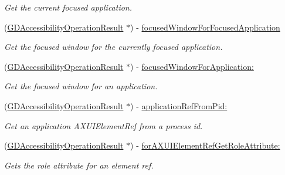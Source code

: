 \begin{DoxyCompactItemize}
\begin{DoxyCompactList}\small\item\em Get the current focused application. \item\end{DoxyCompactList}\item 
\hypertarget{interface_g_d_accessibility_manager_a2316da3b49b4bd75e92970377e2025c8}{
(\hyperlink{interface_g_d_accessibility_operation_result}{GDAccessibilityOperationResult} $\ast$) -\/ \hyperlink{interface_g_d_accessibility_manager_a2316da3b49b4bd75e92970377e2025c8}{focusedWindowForFocusedApplication}}
\label{interface_g_d_accessibility_manager_a2316da3b49b4bd75e92970377e2025c8}

\begin{DoxyCompactList}\small\item\em Get the focused window for the currently focused application. \item\end{DoxyCompactList}\item 
(\hyperlink{interface_g_d_accessibility_operation_result}{GDAccessibilityOperationResult} $\ast$) -\/ \hyperlink{interface_g_d_accessibility_manager_a91408e0f939f8976ee81b2883ecfeac2}{focusedWindowForApplication:}
\begin{DoxyCompactList}\small\item\em Get the focused window for an application. \item\end{DoxyCompactList}\item 
(\hyperlink{interface_g_d_accessibility_operation_result}{GDAccessibilityOperationResult} $\ast$) -\/ \hyperlink{interface_g_d_accessibility_manager_a214e4ffa1c1e2891a733e7779ec687d3}{applicationRefFromPid:}
\begin{DoxyCompactList}\small\item\em Get an application AXUIElementRef from a process id. \item\end{DoxyCompactList}\item 
(\hyperlink{interface_g_d_accessibility_operation_result}{GDAccessibilityOperationResult} $\ast$) -\/ \hyperlink{interface_g_d_accessibility_manager_ace17f7f1f4ea531e557e95951532c715}{forAXUIElementRefGetRoleAttribute:}
\begin{DoxyCompactList}\small\item\em Gets the role attribute for an element ref. \item\end{DoxyCompactList}\item 

\end{DoxyCompactItemize}

